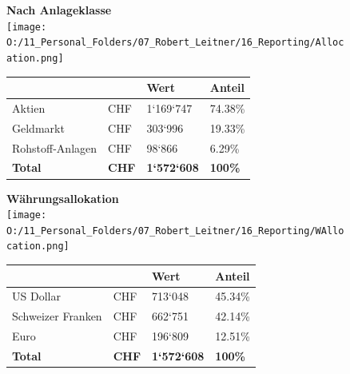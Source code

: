 \documentclass[9pt,landscape,a4paper]{report}
\begin{document}
\begin{figure}[h]
\begin{minipage}[t]{.45\textwidth}
{\bf Nach Anlageklasse} \\
  \texttt{[image: O:/11\_Personal\_Folders/07\_Robert\_Leitner/16\_Reporting/Allocation.png]} \\
       \footnotesize \begin{center} \begin{longtable}{L{4.3cm} L{0.6cm} R{1.5cm} R{1.8cm}}   & & \bf{Wert} & \bf{Anteil}  \\ \toprule[1pt] \endhead Aktien & CHF & 1`169`747 & 74.38\% \\ Geldmarkt & CHF & 303`996 & 19.33\% \\ Rohstoff-Anlagen & CHF & 98`866 & 6.29\% \\   \bottomrule[1pt]  \bf{Total} & \bf{CHF} &  \bf{1`572`608} & \bf{100\% } \end{longtable} \end{center}
\end{minipage}%
\begin{minipage}[t]{.45\textwidth}
  {\bf Währungsallokation} \\
  \texttt{[image: O:/11\_Personal\_Folders/07\_Robert\_Leitner/16\_Reporting/WAllocation.png]} \\
       \footnotesize \begin{center} \begin{longtable}{L{4.3cm} L{0.6cm} R{1.5cm} R{1.8cm}}   & & \bf{Wert} & \bf{Anteil}  \\ \toprule[1pt] \endhead US Dollar & CHF & 713`048 & 45.34\% \\ Schweizer Franken & CHF & 662`751 & 42.14\% \\ Euro & CHF & 196`809 & 12.51\% \\   \bottomrule[1pt]  \bf{Total} & \bf{CHF} &  \bf{1`572`608} & \bf{100\% } \end{longtable} \end{center}
\end{minipage}
\end{figure}
\end{document}
